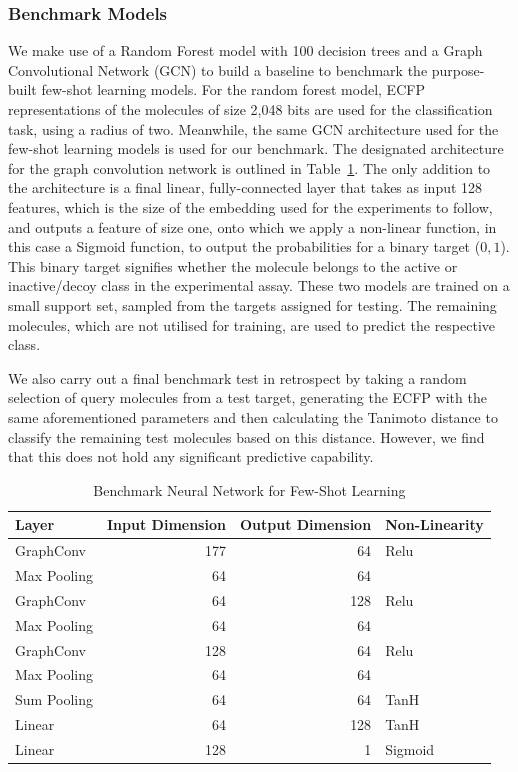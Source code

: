 \subsubsection{Benchmark Models}

We make use of a Random Forest model with 100 decision trees and a Graph Convolutional Network (GCN) to build a baseline to benchmark the purpose-built few-shot learning models. For the random forest model, ECFP representations of the molecules of size 2,048 bits are used for the classification task, using a radius of two. Meanwhile, the same GCN architecture used for the few-shot learning models is used for our benchmark. The designated architecture for the graph convolution network is outlined in Table~\ref{table:benchmarkArchi}. The only addition to the architecture is a final linear, fully-connected layer that takes as input 128 features, which is the size of the embedding used for the experiments to follow, and outputs a feature of size one, onto which we apply a non-linear function, in this case a Sigmoid function, to output the probabilities for a binary target (${0, 1}$). This binary target signifies whether the molecule belongs to the active or inactive/decoy class in the experimental assay. These two models are trained on a small support set, sampled from the targets assigned for testing. The remaining molecules, which are not utilised for training, are used to predict the respective class.

We also carry out a final benchmark test in retrospect by taking a random selection of query molecules from a test target, generating the ECFP with the same aforementioned parameters and then calculating the Tanimoto distance to classify the remaining test molecules based on this distance. However, we find that this does not hold any significant predictive capability. 

\begin{table}
	\centering
	\begin{tabular}{@{}lrrl@{}}
	\hline
	\textbf{Layer} & \textbf{Input Dimension} & \textbf{Output Dimension} & \textbf{Non-Linearity} \\
	\hline
	GraphConv 	& 177 	& 64 	& Relu \\
	Max Pooling & 64 	& 64 	&  \\
	GraphConv 	& 64 	& 128 	& Relu \\
	Max Pooling & 64 	& 64 	&  \\
	GraphConv 	& 128 	& 64 	& Relu \\
	Max Pooling & 64 	& 64 	&  \\
	Sum Pooling & 64 	& 64 	& TanH \\
	Linear 		& 64 	& 128 	& TanH \\
	Linear 		& 128 	& 1 	& Sigmoid \\
	\hline
	\end{tabular}
	\caption{Benchmark Neural Network for Few-Shot Learning}
	\label{table:benchmarkArchi}
\end{table}

